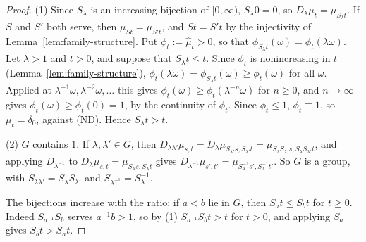 \begin{proof}
(1) Since $S_\lambda$ is an increasing bijection of $[0,\infty)$, $S_\lambda0 = 0$, so
$D_\lambda\mu_t = \mu_{S_\lambda t}$. If $S$ and $S'$ both serve, then $\mu_{St} = \mu_{S't}$, and
$St = S't$ by the injectivity of Lemma~\ref{lem:family-structure}. Put
$\phi_t := \widehat\mu_t > 0$, so that $\phi_{S_\lambda t}(\omega) = \phi_t(\lambda\omega)$. Let
$\lambda > 1$ and $t > 0$, and suppose that $S_\lambda t \le t$. Since $\phi_t$ is nonincreasing in
$t$ (Lemma~\ref{lem:family-structure}), $\phi_t(\lambda\omega) = \phi_{S_\lambda t}(\omega) \ge
\phi_t(\omega)$ for all $\omega$. Applied at $\lambda^{-1}\omega, \lambda^{-2}\omega, \dots$ this
gives $\phi_t(\omega) \ge \phi_t(\lambda^{-n}\omega)$ for $n \ge 0$, and $n \to \infty$ gives
$\phi_t(\omega) \ge \phi_t(0) = 1$, by the continuity of $\phi_t$. Since $\phi_t \le 1$, $\phi_t \equiv 1$,
so $\mu_t = \delta_0$, against (ND). Hence $S_\lambda t > t$.

(2) $G$ contains $1$. If $\lambda, \lambda' \in G$, then
$D_{\lambda\lambda'}\mu_{s,t} = D_\lambda\mu_{S_{\lambda'}s, S_{\lambda'}t} =
\mu_{S_\lambda S_{\lambda'}s, S_\lambda S_{\lambda'}t}$, and applying $D_{\lambda^{-1}}$ to
$D_\lambda\mu_{s,t} = \mu_{S_\lambda s, S_\lambda t}$ gives
$D_{\lambda^{-1}}\mu_{s',t'} = \mu_{S_\lambda^{-1}s', S_\lambda^{-1}t'}$. So $G$ is a group, with
$S_{\lambda\lambda'} = S_\lambda S_{\lambda'}$ and $S_{\lambda^{-1}} = S_\lambda^{-1}$.

The bijections increase with the ratio: if $a < b$ lie in $G$, then $S_at \le S_bt$ for $t \ge 0$.
Indeed $S_{a^{-1}}S_b$ serves $a^{-1}b > 1$, so by (1) $S_{a^{-1}}S_bt > t$ for $t > 0$, and
applying $S_a$ gives $S_bt > S_at$.


\end{proof}
